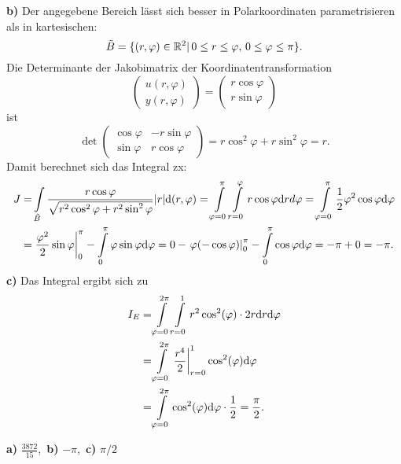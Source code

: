 {\textbf{ b)}  Der angegebene Bereich l\"asst sich besser in Polarkoordinaten parametrisieren als in
kartesischen: 
$$\tilde B = \{(r,\varphi)\in\mathbb{R}^2|\, 0\leq r\leq \varphi,\, 0\leq \varphi\leq \pi\}.$$
Die Determinante der Jakobimatrix der Koordinatentransformation 
$$\begin{pmatrix}u(r,\varphi)\\y(r,\varphi)\end{pmatrix}=\begin{pmatrix}r\cos\varphi\\r\sin\varphi\end{pmatrix}$$ 
ist
$$\det \begin{pmatrix}\cos\varphi&-r\sin\varphi\\ \sin\varphi&r\cos\varphi\end{pmatrix}=
r\cos^2\varphi + r\sin^2\varphi=r.$$
Damit berechnet sich das Integral zx:
\begin{align*}
J=& \int\limits_{\tilde B} \frac{r\cos \varphi}{\sqrt{r^2\cos^2\varphi+ r^2\sin^2\varphi}}|r|\mathrm{d}
(r,\varphi)
= \int\limits_{\varphi=0}^\pi \int\limits_{r=0}^\varphi r\cos\varphi \mathrm{d} r
d\varphi=\int\limits_{\varphi=0}^\pi \frac 12 \varphi^2\cos\varphi\mathrm{d}\varphi\\
=& \left.\frac {\varphi^2}2 \sin\varphi\right|_0^\pi
- \int\limits_0^\pi \varphi \sin\varphi \mathrm{d}\varphi = 0-\left.\varphi(-\cos\varphi)\right|_{0}^\pi
- \int\limits_0^\pi \cos\varphi\mathrm{d}\varphi = -\pi +0=-\pi. 
\end{align*}
\textbf{c)} Das Integral ergibt sich zu
\begin{align*}
I_E=& \int\limits_{\varphi=0}^{2\pi}\int\limits_{r=0}^1 r^2\cos^2(\varphi)\cdot 2r\mathrm{d} r\mathrm{d} \varphi\\
=& \int\limits_{\varphi=0}^{2\pi}\left.\frac{r^4}2\right|_{r=0}^1 \cos^2(\varphi)\mathrm{d} \varphi\\
=& \int\limits_{\varphi=0}^{2\pi}\cos^2(\varphi)\mathrm{d} \varphi \cdot \frac 12
= \frac\pi 2.
\end{align*}
}

{
\textbf{a)} $\frac{3872}{15}$,\, \textbf{b)} $-\pi$,\, \textbf{c)} $\pi/2$
}

